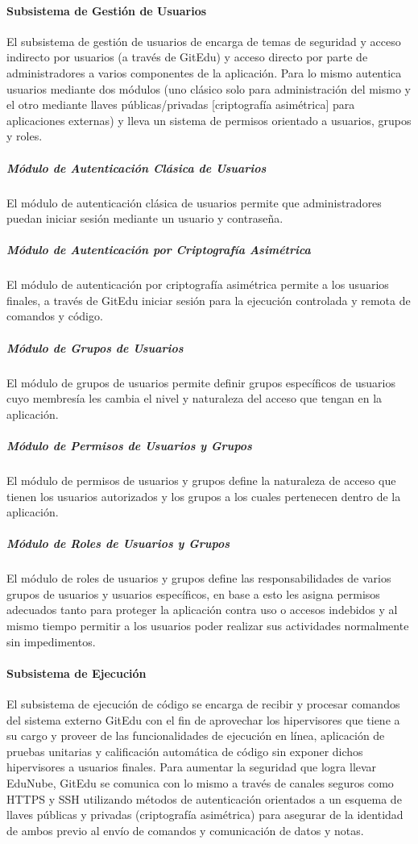 \paragraph{Subsistema de Gestión de Usuarios}
El subsistema de gestión de usuarios de encarga de temas de seguridad y acceso indirecto por usuarios (a través de GitEdu) y acceso directo por parte de administradores a varios componentes de la aplicación. Para lo mismo autentica usuarios mediante dos módulos (uno clásico solo para administración del mismo y el otro mediante llaves públicas/privadas [criptografía asimétrica] para aplicaciones externas) y lleva un sistema de permisos orientado a usuarios, grupos y roles.

\subparagraph{Módulo de Autenticación Clásica de Usuarios}
El módulo de autenticación clásica de usuarios permite que administradores puedan iniciar sesión mediante un usuario y contraseña.

\subparagraph{Módulo de Autenticación por Criptografía Asimétrica}
El módulo de autenticación por criptografía asimétrica permite a los usuarios finales, a través de GitEdu iniciar sesión para la ejecución controlada y remota de comandos y código.

\subparagraph{Módulo de Grupos de Usuarios}
El módulo de grupos de usuarios permite definir grupos específicos de usuarios cuyo membresía les cambia el nivel y naturaleza del acceso que tengan en la aplicación.

\subparagraph{Módulo de Permisos de Usuarios y Grupos}
El módulo de permisos de usuarios y grupos define la naturaleza de acceso que tienen los usuarios autorizados y los grupos a los cuales pertenecen dentro de la aplicación.

\subparagraph{Módulo de Roles de Usuarios y Grupos}
El módulo de roles de usuarios y grupos define las responsabilidades de varios grupos de usuarios y usuarios específicos, en base a esto les asigna permisos adecuados tanto para proteger la aplicación contra uso o accesos indebidos y al mismo tiempo permitir a los usuarios poder realizar sus actividades normalmente sin impedimentos.

\paragraph{Subsistema de Ejecución}
 
El subsistema de ejecución de código se encarga de recibir y procesar  comandos del sistema externo GitEdu con el fin de aprovechar los hipervisores que tiene a su cargo y proveer de las funcionalidades de ejecución en línea, aplicación de pruebas unitarias y calificación automática de código sin exponer dichos hipervisores a usuarios finales. Para aumentar la seguridad que logra llevar EduNube, GitEdu se comunica con lo mismo a través de canales seguros como HTTPS y SSH utilizando métodos de autenticación orientados a un esquema de llaves públicas y privadas (criptografía asimétrica) para asegurar de la identidad de ambos previo al envío de comandos y comunicación de datos y notas.


